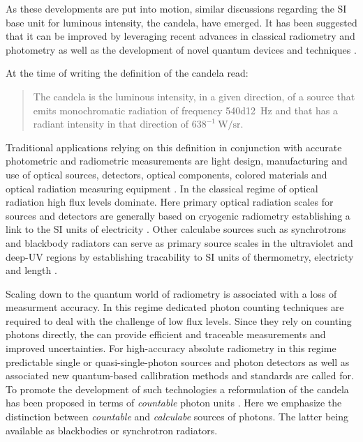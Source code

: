 			As these developments are put into motion, similar discussions regarding the SI base unit for luminous intensity, the candela, have emerged. It has been suggested that it can be improved by leveraging recent advances in classical radiometry and photometry as well as the development of novel quantum devices and techniques \cite{Cheung2007}.

			At the time of writing the definition of the candela read:

			\begin{quote}
			The candela is the luminous intensity, in a given direction, of a source that emits monochromatic radiation of frequency \SI{540d12}{\hertz} and that has a radiant intensity in that direction of $638^{-1} \SI{}{\watt\per\steradian}$.
		  \end{quote}

			Traditional applications relying on this definition in conjunction with accurate photometric and radiometric measurements are light design, manufacturing and use of optical sources, detectors, optical components, colored materials and optical radiation measuring equipment \cite{zwinckels::paper}. In the classical regime of optical radiation high flux levels dominate. Here primary optical radiation scales for sources and detectors are generally based on cryogenic radiometry establishing a link to the SI units of electricity \cite{Cheung2007::5}. Other calculabe sources such as synchrotrons and blackbody radiators can serve as primary source scales in the ultraviolet and deep-UV regions by establishing tracability to SI units of thermometry, electricty and length \cite{zwinckels::paper, Cheung2007}.

			Scaling down to the quantum world of radiometry is associated with a loss of measurment accuracy. In this regime dedicated photon counting techniques are required to deal with the challenge of low flux levels. Since they rely on counting photons directly, the can provide efficient and traceable measurements and improved uncertainties. For high-accuracy absolute radiometry in this regime predictable single or quasi-single-photon sources and photon detectors as well as associated new quantum-based callibration methods and standards are called for. To promote the development of such technologies a reformulation of the candela has been proposed in terms of \emph{countable} photon units \cite{zwinckels::paper, Cheung2007, Milton, Martin (14 November 2016). Highlights in the work of the BIPM in 2016, www.quantumcandela.org}. Here we emphasize the distinction between \emph{countable} and \emph{calculabe} sources of photons. The latter being available as blackbodies or synchrotron radiators.

